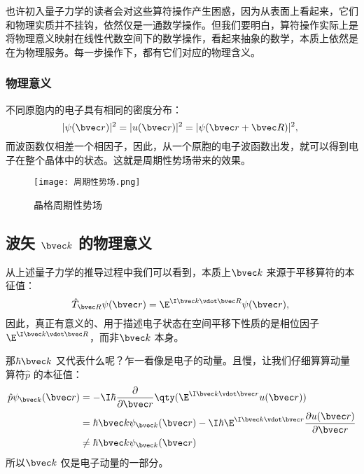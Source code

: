 也许初入量子力学的读者会对这些算符操作产生困惑，因为从表面上看起来，它们和物理实质并不挂钩，依然仅是一通数学操作。但我们要明白，算符操作实际上是将物理意义映射在线性代数空间下的数学操作，看起来抽象的数学，本质上依然是在为物理服务。每一步操作下，都有它们对应的物理含义。

\subsubsection{物理意义}
不同原胞内的电子具有相同的密度分布：
\begin{equation}
|\psi(\bvec r)|^2 = |u(\bvec r)|^2 = |\psi(\bvec r + \bvec R)|^2,~
\end{equation}
而波函数仅相差一个相因子，因此，从一个原胞的电子波函数出发，就可以得到电子在整个晶体中的状态。这就是周期性势场带来的效果。

\begin{figure}[ht]
\centering
\texttt{[image: 周期性势场.png]}
\caption{晶格周期性势场} \label{Bloch_fig1}
\end{figure}

\subsection{波矢 $\bvec k$ 的物理意义}
从上述量子力学的推导过程中我们可以看到，本质上$\bvec k$ 来源于平移算符的本征值：
\begin{equation}
\hat{T}_{\bvec R} \psi (\bvec r) = \E^{\I \bvec k \vdot  \bvec R}\psi (\bvec r),~
\end{equation}
因此，真正有意义的、用于描述电子状态在空间平移下性质的是相位因子$\E^{\I \bvec k \vdot  \bvec R}$，而非$\bvec k$ 本身。

那$\hbar \bvec k$ 又代表什么呢？乍一看像是电子的动量。且慢，让我们仔细算算动量算符$\hat{p}$ 的本征值：
\begin{equation}
\begin{aligned}
\hat{p} \psi_{\bvec k} (\bvec r) &= -\I \hbar \dfrac{\partial}{\partial \bvec r} \qty(\E^{\I \bvec k \vdot \bvec r} u(\bvec r))\\
& = \hbar \bvec k \psi_{\bvec k} (\bvec r) -\I \hbar \E^{\I \bvec k \vdot \bvec r} \dfrac{\partial  u(\bvec r)}{\partial \bvec r}\\
 &\neq \hbar \bvec k \psi_{\bvec k} (\bvec r)\\
\end{aligned}
\end{equation}
所以$\bvec k$ 仅是电子动量的一部分。

